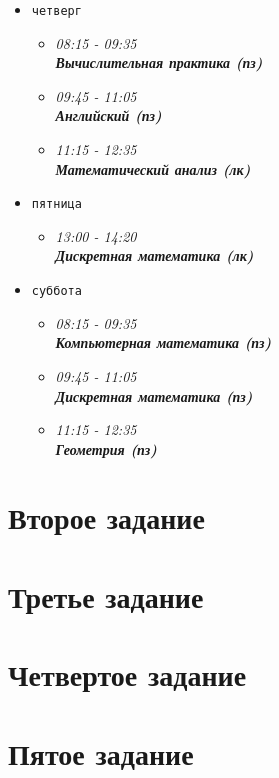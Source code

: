 \documentclass[a4paper,11pt]{article} %
\begin{document}
\begin{itemize}
{\begin{itemize}
{					\bf Математический анализ (пз)}
			\end{itemize}	
		}
		\item {
			\texttt{четверг}
			\begin{itemize}
				\item[\checkmark]{\it 08:15 - 09:35 \\
					\bf Вычислительная практика (пз)}
				\item[\checkmark]{\it 09:45 - 11:05 \\
					\bf Английский (пз)}
				\item[\checkmark]{\it 11:15 - 12:35 \\
					\bf Математический анализ (лк)}
			\end{itemize}	
		}
		\item {
			\texttt{пятница}
			\begin{itemize}
				\item[\checkmark]{\it 13:00 - 14:20 \\
					\bf Дискретная математика (лк)} 
			\end{itemize}	
		}
		\item {
			\texttt{суббота}
			\begin{itemize}
				\item[\checkmark]{\it 08:15 - 09:35 \\
					\bf Компьютерная математика (пз)}
				\item[\checkmark]{\it 09:45 - 11:05 \\
					\bf Дискретная математика (пз)}
				\item[\checkmark]{\it 11:15 - 12:35 \\
					\bf Геометрия (пз)}
			\end{itemize}	
		}
	\end{itemize}
	
	\section{Второе задание}
	
	\section{Третье задание}
	
	\section{Четвертое задание}
	
	\section{Пятое задание}
	
\end{document}
